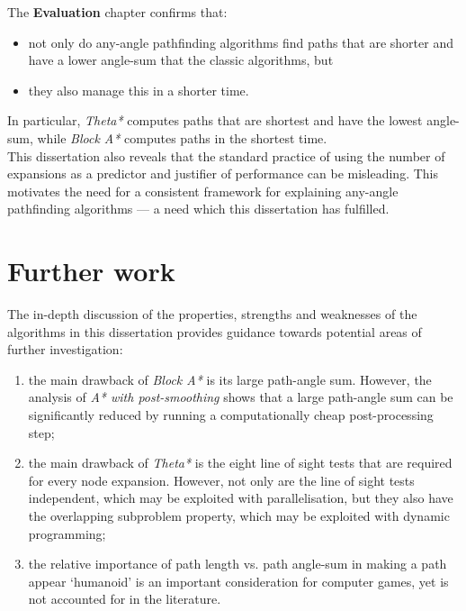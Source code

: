 \documentclass[12pt,notitlepage]{report}
\begin{document}
\noindent
The {\bfseries Evaluation} chapter confirms that:
\begin{itemize} 
\item not only do any-angle pathfinding algorithms find paths that are shorter and have a lower angle-sum that the classic algorithms, but 
\item they also manage this in a shorter time. 
\end{itemize}

\noindent
In particular, {\em Theta*} computes paths that are shortest and have the lowest angle-sum, while {\em Block A*} computes paths in the shortest time.\\

\noindent
This dissertation also reveals that the standard practice of using the number of expansions as a predictor and justifier of performance can be misleading. This motivates the need for a consistent framework for explaining any-angle pathfinding algorithms --- a need which this dissertation has fulfilled.

\section{Further work}
The in-depth discussion of the properties, strengths and weaknesses of the algorithms in this dissertation provides guidance towards potential areas of further investigation:
\begin{enumerate}
\item the main drawback of {\em Block A*} is its large path-angle sum. However, the analysis of {\em A* with post-smoothing} shows that a large path-angle sum can be significantly reduced by running a computationally cheap post-processing step;
\item the main drawback of {\em Theta*} is the eight line of sight tests that are required for every node expansion. However, not only are the line of sight tests independent, which may be exploited with parallelisation, but they also have the overlapping subproblem property, which may be exploited with dynamic programming;
\item the relative importance of path length vs. path angle-sum in making a path appear `humanoid' is an important consideration for computer games, yet is not accounted for in the literature.
\end{enumerate} 

{}



\end{document}
